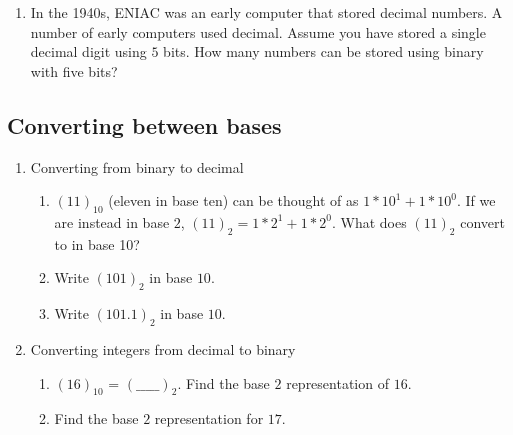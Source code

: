 \documentclass[12pt,letterpaper,noanswers]{exam}
\begin{document}
\begin{enumerate}[resume]
\item In the 1940s, ENIAC was an early computer that stored decimal numbers.  A number of early computers used decimal.  Assume you have stored a single decimal digit using $5$ bits.  How many numbers can be stored using binary with five bits?
\vspace{1in}
\end{enumerate}

\subsection{Converting between bases}


\begin{enumerate}[resume]
\itemsep40pt
    \item Converting from binary to decimal 
    \begin{enumerate}
    \itemsep40pt
        \item $(11)_{10}$ (eleven in base ten) can be thought of as $1*10^1+1*10^0$.  If we are instead in base $2$, $(11)_2 = 1*2^1+1*2^0$. What does $(11)_2$ convert to in base 10?
        \item Write $(101)_2$ in base $10$.
        \item Write $(101.1)_2$ in base $10$.
    \end{enumerate}
    \item Converting integers from decimal to binary
    \begin{enumerate}
    \itemsep40pt
        \item $(16)_{10}$ = $(\_ \_ \_ \_ \_)_2$.  Find the base $2$ representation of $16$.
        \item Find the base $2$ representation for $17$.
    \end{enumerate}
\end{enumerate}
\end{document}
